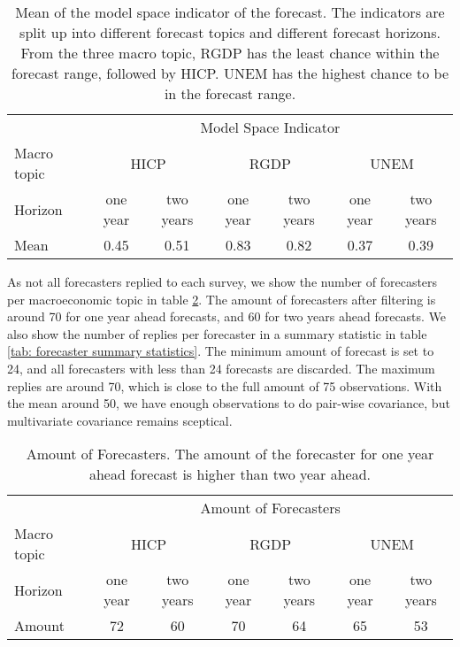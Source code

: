 \documentclass[11pt]{article}
\begin{document}
\begin{table}[!h]
	\centering
	\caption{Mean of the model space indicator of the forecast. The indicators are split up into different forecast topics and different forecast horizons. From the three macro topic, RGDP has the least chance within the forecast range, followed by HICP. UNEM has the highest chance to be in the forecast range.}
	\label{tab: modelspace summary statistics}
	\begin{tabular}{lcccccc}
		\hline
		&\multicolumn{6}{c}{Model Space Indicator}\\
		\cmidrule(lr){2-7}
		Macro topic & \multicolumn{2}{c}{HICP} & \multicolumn{2}{c}{RGDP} & \multicolumn{2}{c}{UNEM} \\
		\cmidrule(lr){2-3} \cmidrule(lr){4-5}\cmidrule(lr){6-7}
		Horizon     & one year & two years & one year & two years & one year & two years \\ 
		\hline
		Mean        & 0.45        & 0.51         & 0.83        & 0.82        & 0.37         & 0.39       \\
		\hline
	\end{tabular}
\end{table}

As not all forecasters replied to each survey, we show the number of forecasters per macroeconomic topic in table \ref{tab: amount of forecasters}. The amount of forecasters after filtering is around 70 for one year ahead forecasts, and 60 for two years ahead forecasts. We also show the number of replies per forecaster in a summary statistic in table \ref{tab: forecaster summary statistics}. The minimum amount of forecast is set to 24, and all forecasters with less than 24 forecasts are discarded. The maximum replies are around 70, which is close to the full amount of 75 observations. With the mean around 50, we have enough observations to do pair-wise covariance, but multivariate covariance remains sceptical.

\begin{table}[!h]
	\centering
	\caption{Amount of Forecasters. The amount of the forecaster for one year ahead forecast is higher than two year ahead.}
	\label{tab: amount of forecasters}
	\begin{tabular}{lcccccc}
		\hline
		&\multicolumn{6}{c}{Amount of Forecasters}\\
		\cmidrule(lr){2-7}
		Macro topic & \multicolumn{2}{c}{HICP} & \multicolumn{2}{c}{RGDP} & \multicolumn{2}{c}{UNEM} \\
		\cmidrule(lr){2-3} \cmidrule(lr){4-5}\cmidrule(lr){6-7}
		Horizon     & one year & two years & one year & two years & one year & two years \\ 
		\hline
		Amount        &      72   &60          &70         &64         & 65         & 53       \\
		\hline
	\end{tabular}
\end{table}
\end{document}
